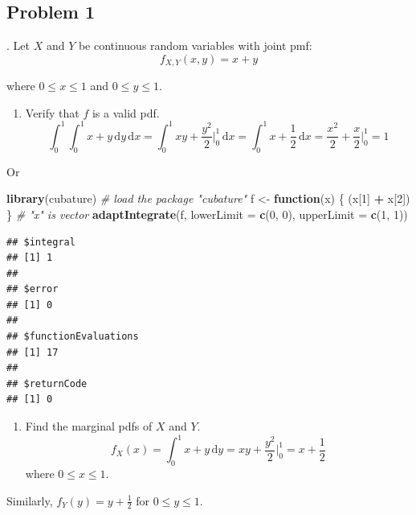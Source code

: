 \documentclass[
]{book}
\newenvironment{Shaded}{\begin{snugshade}}{\end{snugshade}}
\newcommand{\CommentTok}[1]{\textcolor[rgb]{0.56,0.35,0.01}{\textit{#1}}}
\newcommand{\ControlFlowTok}[1]{\textcolor[rgb]{0.13,0.29,0.53}{\textbf{#1}}}
\newcommand{\DataTypeTok}[1]{\textcolor[rgb]{0.13,0.29,0.53}{#1}}
\newcommand{\DecValTok}[1]{\textcolor[rgb]{0.00,0.00,0.81}{#1}}
\newcommand{\KeywordTok}[1]{\textcolor[rgb]{0.13,0.29,0.53}{\textbf{#1}}}
\newcommand{\NormalTok}[1]{#1}
\newcommand{\OperatorTok}[1]{\textcolor[rgb]{0.81,0.36,0.00}{\textbf{#1}}}
\newcommand{\StringTok}[1]{\textcolor[rgb]{0.31,0.60,0.02}{#1}}
\providecommand{\tightlist}{%
  \setlength{\itemsep}{0pt}\setlength{\parskip}{0pt}}
\begin{document}
\hypertarget{problem-1-13}{%
\subsection{Problem 1}\label{problem-1-13}}

. Let \(X\) and \(Y\) be continuous random variables with joint pmf:
\[
f_{X,Y}(x,y)=x + y
\]

where \(0 \leq x \leq 1\) and \(0 \leq y \leq 1\).

\begin{enumerate}
\def\labelenumi{\alph{enumi}.}
\tightlist
\item
  Verify that \(f\) is a valid pdf.
  \[
  \int_0^1\int_0^1 x+y\,\mathrm{d}y \,\mathrm{d}x = \int_0^1 xy + \frac{y^2}{2}\bigg|_0^1 \,\mathrm{d}x = \int_0^1 x+\frac{1}{2}\,\mathrm{d}x = \frac{x^2}{2}+\frac{x}{2}\bigg|_0^1=1
  \]
\end{enumerate}

Or

\begin{Shaded}
\begin{Highlighting}[]
\KeywordTok{library}\NormalTok{(cubature) }\CommentTok{# load the package "cubature"}
\NormalTok{f <-}\StringTok{ }\ControlFlowTok{function}\NormalTok{(x) \{ (x[}\DecValTok{1}\NormalTok{] }\OperatorTok{+}\StringTok{ }\NormalTok{x[}\DecValTok{2}\NormalTok{]) \} }\CommentTok{# "x" is vector}
\KeywordTok{adaptIntegrate}\NormalTok{(f, }\DataTypeTok{lowerLimit =} \KeywordTok{c}\NormalTok{(}\DecValTok{0}\NormalTok{, }\DecValTok{0}\NormalTok{), }\DataTypeTok{upperLimit =} \KeywordTok{c}\NormalTok{(}\DecValTok{1}\NormalTok{, }\DecValTok{1}\NormalTok{))}
\end{Highlighting}
\end{Shaded}

\begin{verbatim}
## $integral
## [1] 1
## 
## $error
## [1] 0
## 
## $functionEvaluations
## [1] 17
## 
## $returnCode
## [1] 0
\end{verbatim}

\begin{enumerate}
\def\labelenumi{\alph{enumi}.}
\setcounter{enumi}{1}
\tightlist
\item
  Find the marginal pdfs of \(X\) and \(Y\).
  \[
  f_X(x)=\int_0^1 x+y\,\mathrm{d}y = xy + \frac{y^2}{2}\bigg|_0^1 =  x+\frac{1}{2}
  \]
  where \(0\leq x \leq 1\).
\end{enumerate}

Similarly, \(f_Y(y)=y+\frac{1}{2}\) for \(0 \leq y \leq 1\).
\end{document}
